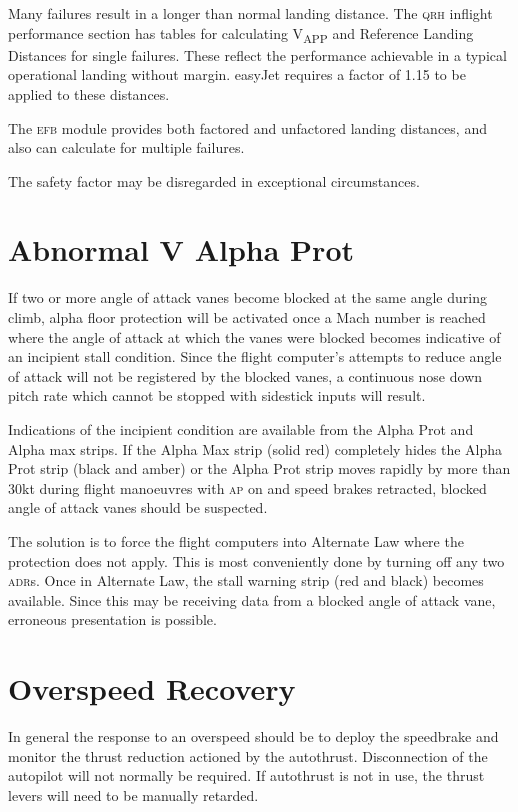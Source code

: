 \documentclass[a5paper,11pt,twoside]{book}
\newcommand{\ac}[1]{{\scshape\MakeLowercase{#1}}}
\newcommand{\inlcite}[1]{{\ac{#1}}}
\newcommand{\multicite}[1]{%
  \nopagebreak
  \noindent{{\color{blue}\footnotesize[\inlcite{#1}]}}
}
\newcommand{\V}[1]{V\textsubscript{#1}}
\begin{document}
Many failures result in a longer than normal landing distance. The \ac{QRH}
inflight performance section has tables for calculating \V{APP} and Reference
Landing Distances for single failures. These reflect the performance achievable
in a typical operational landing without margin. easyJet requires a factor of
1.15 to be applied to these distances.

The \ac{EFB} module provides both factored and unfactored landing distances, and
also can calculate for multiple failures.

The safety factor may be disregarded in exceptional circumstances.

\multicite{QRH~IFP, FCOM~PER.LDG, EOMB~4.14.2}

\section{Abnormal V Alpha Prot}

If two or more angle of attack vanes become blocked at the same angle during
climb, alpha floor protection will be activated once a Mach number is reached
where the angle of attack at which the vanes were blocked becomes indicative of
an incipient stall condition. Since the flight computer's attempts to reduce
angle of attack will not be registered by the blocked vanes, a continuous nose
down pitch rate which cannot be stopped with sidestick inputs will result.

Indications of the incipient condition are available from the Alpha Prot and
Alpha max strips. If the Alpha Max strip (solid red) completely hides the Alpha
Prot strip (black and amber) or the Alpha Prot strip moves rapidly by more than
30kt during flight manoeuvres with \ac{AP} on and speed brakes retracted, blocked
angle of attack vanes should be suspected.

The solution is to force the flight computers into Alternate Law where the
protection does not apply. This is most conveniently done by turning off any two
\ac{ADR}s. Once in Alternate Law, the stall warning strip (red and black)
becomes available. Since this may be receiving data from a blocked angle of
attack vane, erroneous presentation is possible.

\multicite{OEBPROC-48}

\section{Overspeed Recovery}

In general the response to an overspeed should be to deploy the speedbrake and
monitor the thrust reduction actioned by the autothrust. Disconnection of the
autopilot will not normally be required. If autothrust is not in use, the thrust
levers will need to be manually retarded.
\end{document}
